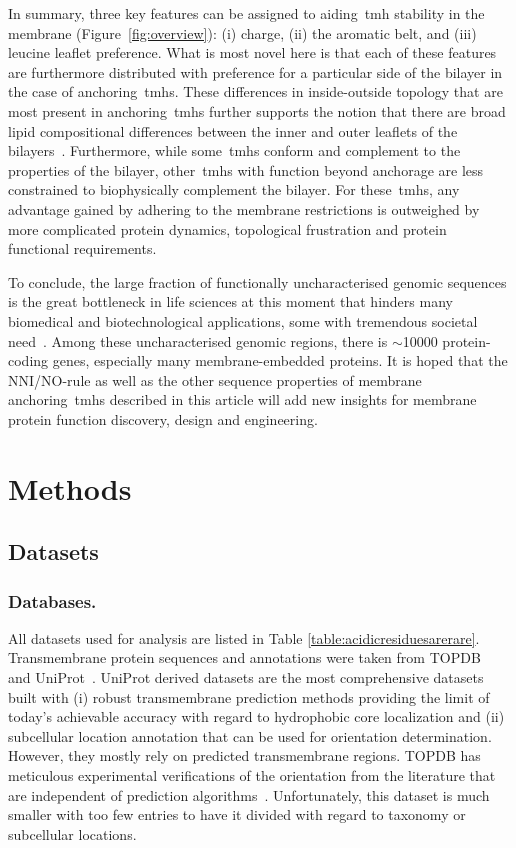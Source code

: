 In summary, three key features can be assigned to aiding~\gls{tmh} stability in the membrane (Figure~\ref{fig:overview}): (i) charge, (ii) the aromatic belt, and (iii) leucine leaflet preference.
What is most novel here is that each of these features are furthermore distributed with preference for a particular side of the bilayer in the case of anchoring~\gls{tmh}s.
These differences in inside-outside topology that are most present in anchoring~\gls{tmh}s further supports the notion that there are broad lipid compositional differences between the inner and outer leaflets of the bilayers~\cite{Sharpe2010}.
Furthermore, while some~\gls{tmh}s conform and complement to the properties of the bilayer, other~\gls{tmh}s with function beyond anchorage are less constrained to biophysically complement the bilayer.
For these~\gls{tmh}s, any advantage gained by adhering to the membrane restrictions is outweighed by more complicated protein dynamics, topological frustration and protein functional requirements.

To conclude, the large fraction of functionally uncharacterised genomic sequences is the great bottleneck in life sciences at this moment that hinders many biomedical and biotechnological applications, some with tremendous societal need~\cite{Eisenhaber2012,Kuznetsov2013}.
Among these uncharacterised genomic regions, there is \(\sim\)10000 protein-coding genes, especially many membrane-embedded proteins.
It is hoped that the NNI/NO-rule as well as the other sequence properties of membrane anchoring~\gls{tmh}s described in this article will add new insights for membrane protein function discovery, design and engineering.

\section{Methods}

\subsection{Datasets}
\subsubsection{Databases.}
All datasets used for analysis are listed in Table \ref{table:acidicresiduesarerare}.
Transmembrane protein sequences and annotations were taken from TOPDB~\cite{Dobson2015} and UniProt~\cite{TheUniProtConsortium2014}.
UniProt derived datasets are the most comprehensive datasets built with (i) robust transmembrane prediction methods providing the limit of today’s achievable accuracy with regard to hydrophobic core localization and (ii) subcellular location annotation that can be used for orientation determination.
However, they mostly rely on predicted transmembrane regions.
TOPDB has meticulous experimental verifications of the orientation from the literature that are independent of prediction algorithms~\cite{Dobson2015}.
Unfortunately, this dataset is much smaller with too few entries to have it divided with regard to taxonomy or subcellular locations.

